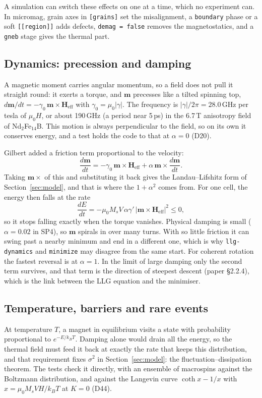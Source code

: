 \documentclass[10pt,a4paper]{article}
\newcommand{\code}[1]{\texttt{#1}}
\newcommand{\mo}{\mu_0}
\newcommand{\vm}{\mathbf{m}}
\newcommand{\vH}{\mathbf{H}}
\newcommand{\dec}[1]{\textcolor{comment}{\small(#1)}}
\begin{document}
A simulation can switch these effects on one at a time, which no experiment can. In micromag, grain axes in \code{[grains]}
set the misalignment, a \code{boundary} phase or a soft \code{[[region]]} adds defects, \code{demag = false} removes the
magnetostatics, and a \code{gneb} stage gives the thermal part.

\subsection{Dynamics: precession and damping}
A magnetic moment carries angular momentum, so a field does not pull it straight round: it exerts a torque, and $\vm$
precesses like a tilted spinning top, $d\vm/dt = -\gamma_0\,\vm\times\vH_\mathrm{eff}$ with $\gamma_0 = \mo|\gamma|$. The
frequency is $|\gamma|/2\pi = 28.0$\,GHz per tesla of $\mo H$, or about 190\,GHz (a period near 5\,ps) in the 6.7\,T
anisotropy field of Nd$_2$Fe$_{14}$B. This motion is always perpendicular to the field, so on its own it conserves
energy, and a test holds the code to that at $\alpha=0$ \dec{D20}.

Gilbert \cite{gilbert} added a friction term proportional to the velocity:
\[
  \frac{d\vm}{dt} = -\gamma_0\,\vm\times\vH_\mathrm{eff} + \alpha\,\vm\times\frac{d\vm}{dt}.
\]
Taking $\vm\times$ of this and substituting it back gives the Landau--Lifshitz form of Section~\ref{sec:model}, and that
is where the $1+\alpha^2$ comes from. For one cell, the energy then falls at the rate
\[
  \frac{dE}{dt} = -\mo M_s V\,\alpha\gamma'\,|\vm\times\vH_\mathrm{eff}|^2 \leq 0,
\]
so it stops falling exactly when the torque vanishes. Physical damping is small ($\alpha = 0.02$ in SP4), so $\vm$
spirals in over many turns. With so little friction it can swing past a nearby minimum and end in a different one, which
is why \code{llg-dynamics} and \code{minimize} may disagree from the same start. For coherent rotation the fastest
reversal is at $\alpha = 1$. In the limit of large damping only the second term survives, and that term is the direction
of steepest descent (paper \S2.2.4), which is the link between the LLG equation and the minimiser.

\subsection{Temperature, barriers and rare events}
At temperature $T$, a magnet in equilibrium visits a state with probability proportional to $e^{-E/k_BT}$. Damping
alone would drain all the energy, so the thermal field must feed it back at exactly the rate that keeps this
distribution, and that requirement fixes $\sigma^2$ in Section~\ref{sec:model}: the fluctuation--dissipation theorem. The
tests check it directly, with an ensemble of macrospins against the Boltzmann distribution, and against the Langevin
curve $\coth x - 1/x$ with $x = \mo M_s V H/k_BT$ at $K=0$ \dec{D44}.
\end{document}
